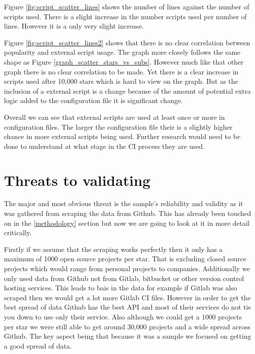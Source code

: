 \documentclass[10pt,conference]{IEEEtran}
\begin{document}
Figure \ref{fig:script_scatter_lines} shows the number of lines against the number of scripts used. There is a slight increase in the number scripts used per number of lines. However it is a only very slight increase.

Figure \ref{fig:script_scatter_lines2} shows that there is no clear correlation between popularity and external script usage. The graph more closely follows the same shape as Figure \ref{graph_scatter_stars_vs_subs}. However much like that other graph there is no clear correlation to be made. Yet there is a clear increase in scripts used after 10,000 stars which is hard to view on the graph. But as the inclusion of a external script is a change because of the amount of potential extra logic added to the configuration file it is significant change. 

Overall we can see that external scripts are used at least once or more in configuration files. The larger the configuration file their is a slightly higher chance in more external scripts being used. Further research would need to be done to understand at what stage in the CI process they are used. 

\pagebreak

\section{Threats to validating}

The major and most obvious threat is the sample's reliability and validity as it was gathered from scraping the data from Github. This has already been touched on in the \ref{methodology} section but now we are going to look at it in more detail critically.

Firstly if we assume that the scraping works perfectly then it only has a maximum of 1000 open source projects per star. That is excluding closed source projects which would range from personal projects to companies. Additionally we only used data from Github not from Gitlab, bitbucket or other version control hosting services. This leads to bais in the data for example if Gitlab was also scraped then we would get a lot more Gitlab CI files. However in order to get the best spread of data Github has the best API and most of their services do not tie you down to use only their service. Also although we could get a 1000 projects per star we were still able to get around 30,000 projects and a wide spread across Github. The key aspect being that because it was a sample we focused on getting a good spread of data.
\end{document}
